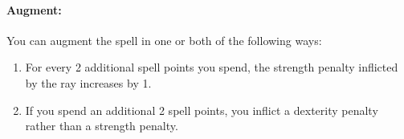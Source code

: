 \paragraph{Augment:} You can augment the spell in one or both of the following ways: 
\begin{enumerate}
 \item For every 2 additional spell points you spend, the strength penalty inflicted by the ray increases by 1.
 \item If you spend an additional 2 spell points, you inflict a dexterity penalty rather than a strength penalty.
\end{enumerate}

% 
% 
